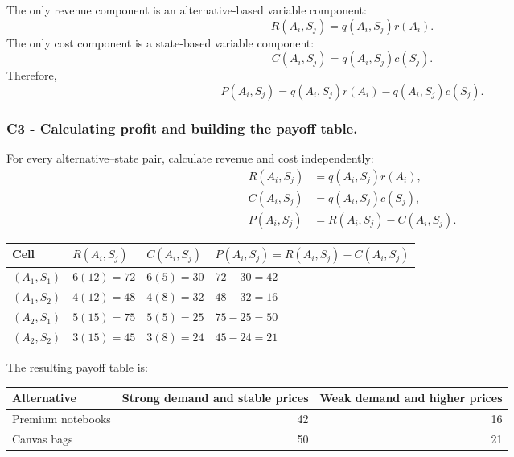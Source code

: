 The only revenue component is an alternative-based variable component:
\[
R(A_i,S_j)=q(A_i,S_j)r(A_i).
\]
The only cost component is a state-based variable component:
\[
C(A_i,S_j)=q(A_i,S_j)c(S_j).
\]
Therefore,
\[
P(A_i,S_j)
=
q(A_i,S_j)r(A_i)
-
q(A_i,S_j)c(S_j).
\]


\subsubsection*{C3 - Calculating profit and building the payoff table.}
\label{subsec:problem5-custom-printing-product-line-c3}

For every alternative--state pair, calculate revenue and cost independently:
\[
\begin{aligned}
	R(A_i,S_j)&=q(A_i,S_j)r(A_i),
	\\
	C(A_i,S_j)&=q(A_i,S_j)c(S_j),
	\\
	P(A_i,S_j)&=R(A_i,S_j)-C(A_i,S_j).
\end{aligned}
\]

\begin{center}
	\small
	\begin{tabular}{llll}
		\toprule
		Cell
		& \(R(A_i,S_j)\)
		& \(C(A_i,S_j)\)
		& \(P(A_i,S_j)=R(A_i,S_j)-C(A_i,S_j)\) \\
		\midrule
		\((A_1,S_1)\)
		& \(6(12)=72\)
		& \(6(5)=30\)
		& \(72-30=42\) \\
		
		\((A_1,S_2)\)
		& \(4(12)=48\)
		& \(4(8)=32\)
		& \(48-32=16\) \\
		
		\((A_2,S_1)\)
		& \(5(15)=75\)
		& \(5(5)=25\)
		& \(75-25=50\) \\
		
		\((A_2,S_2)\)
		& \(3(15)=45\)
		& \(3(8)=24\)
		& \(45-24=21\) \\
		\bottomrule
	\end{tabular}
\end{center}

The resulting payoff table is:

\begin{center}
	\begin{tabular}{lrr}
		\toprule
		Alternative
		& Strong demand and stable prices
		& Weak demand and higher prices \\
		\midrule
		Premium notebooks & 42 & 16 \\
		Canvas bags & 50 & 21 \\
		\bottomrule
	\end{tabular}
\end{center}

